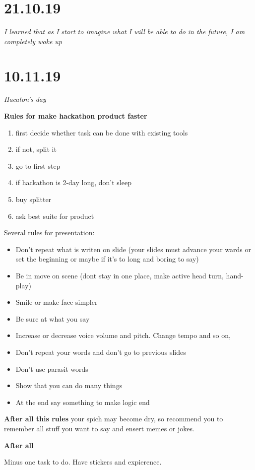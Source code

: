 \documentclass[12pt,a4paper,titlepage]{article}
\begin{document}
\newpage
\section{21.10.19}

\textit{I learned that as I start to imagine what I will be able to do in the future, I am completely woke up}

\newpage
\section{10.11.19}
\textit{Hacaton's day}  
\begin{center}
  \textbf{Rules for make hackathon product faster}
\end{center}
\begin{enumerate}
  \item first decide whether task can be done with existing tools
  \item if not, split it
  \item go to first step
  \item if hackathon is 2-day long, don't sleep
  \item buy splitter
  \item ask best suite for product
\end{enumerate}
Several rules for presentation:
\begin{itemize}
  \item Don't repeat what is writen on slide (your slides must advance
    your wards or set the beginning or maybe if it's to long and boring
    to say)
  \item Be in move on scene (dont stay in one place, make active head
    turn, hand-play)
  \item Smile or make face simpler
  \item Be sure at what you say
  \item Increase or decrease voice volume and pitch. Change tempo and so
    on,
  \item Don't repeat your words and don't go to previous slides
  \item Don't use parasit-words
  \item Show that you can do many things
  \item At the end say something to make logic end
\end{itemize}
\textbf{After all this rules} your spich may become dry, so recommend you to
remember all stuff you want to say and ensert memes or jokes.

\begin{center}
  \textbf{After all}
\end{center}
Minus one task to do. Have stickers and expierence.
\end{document}
